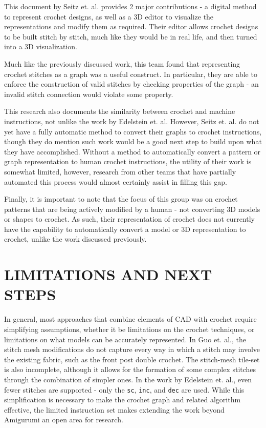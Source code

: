 \documentclass{IEEEcsmag}
\begin{document}
This document by Seitz et. al. provides 2 major contributions - a digital method to represent crochet designs, as well as a 3D editor to visualize the representations and modify them as required. Their editor allows crochet designs to be built stitch by stitch, much like they would be in real life, and then turned into a 3D visualization. 

Much like the previously discussed work, this team found that representing crochet stitches as a graph was a useful construct. In particular, they are able to enforce the construction of valid stitches by checking properties of the graph - an invalid stitch connection would violate some property. 

This research also documents the similarity between crochet and machine instructions, not unlike the work by Edelstein et. al. 
However, Seitz et. al. do not yet have a fully automatic method to convert their graphs to crochet instructions, though they do mention such work would be a good next step to build upon what they have accomplished. Without a method to automatically convert a pattern or graph representation to human crochet instructions, the utility of their work is somewhat limited, however, research from other teams that have partially automated this process would almost certainly assist in filling this gap. 

Finally, it is important to note that the focus of this group was on crochet patterns that are being actively modified by a human - not converting 3D models or shapes to crochet. As such, their representation of crochet does not currently have the capability to automatically convert a model or 3D representation to crochet, unlike the work discussed previously. 

\section{LIMITATIONS AND NEXT STEPS}

In general, most approaches that combine elements of CAD with crochet require simplifying assumptions, whether it be limitations on the crochet techniques, or limitations on what models can be accurately represented. In Guo et. al., the stitch mesh modifications do not capture every way in which a stitch may involve the existing fabric, such as the front post double crochet. The stitch-mesh tile-set is also incomplete, although it allows for the formation of some complex stitches through the combination of simpler ones. In the work by Edelstein et. al., even fewer stitches are supported - only the \verb|sc|, \verb|inc|, and \verb|dec| are used. While this simplification is necessary to make the crochet graph and related algorithm effective, the limited instruction set makes extending the work beyond Amigurumi an open area for research.
\end{document}
